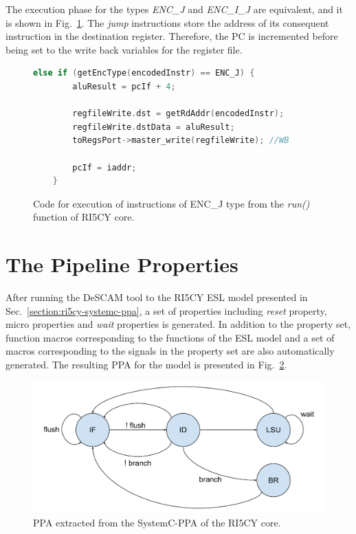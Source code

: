 The execution phase for the types \textit{ENC\_J} and \textit{ENC\_I\_J} are equivalent, and it is shown in Fig.~\ref{fig:ri5cy-enc-j}. The \textit{jump} instructions store the address of its consequent instruction in the destination register. Therefore, the PC is incremented before being set to the write back variables for the register file.

\begin{figure}[htb!]
    \begin{lstlisting}[language=c++]
    else if (getEncType(encodedInstr) == ENC_J) {
        aluResult = pcIf + 4;
        
        regfileWrite.dst = getRdAddr(encodedInstr);
        regfileWrite.dstData = aluResult;
        toRegsPort->master_write(regfileWrite); //WB
        
        pcIf = iaddr;
    }\end{lstlisting}
    \caption{Code for execution of instructions of ENC\_J type from the \textit{run()} function of RI5CY core.}
    \label{fig:ri5cy-enc-j}
\end{figure}

\section{The Pipeline Properties}
\label{section:ri5cy_pipe_ppt}

After running the DeSCAM tool to the RI5CY ESL model presented in Sec.~\ref{section:ri5cy-systemc-ppa}, a set of properties including \textit{reset} property, micro properties and \textit{wait} properties is generated. In addition to the property set, function macros corresponding to the functions of the ESL model and a set of macros corresponding to the signals in the property set are also automatically generated. The resulting PPA for the model is presented in Fig.~\ref{fig:ri5cy-ppa}.

\begin{figure}[htb!]
	\centering
	\includegraphics[width=\textwidth]{images/ri5cy-ppa.pdf}
	\caption{PPA extracted from the SystemC-PPA of the RI5CY core.}
	\label{fig:ri5cy-ppa}
\end{figure}

